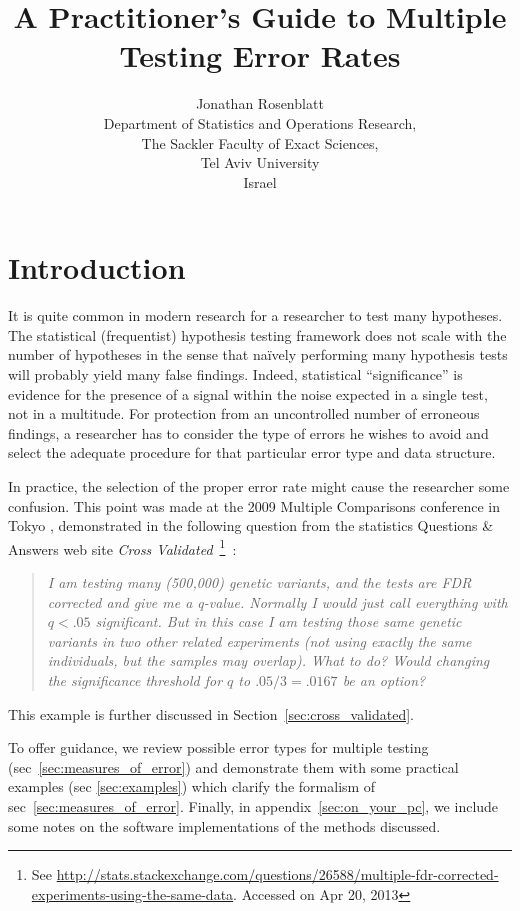 \documentclass[review,12pt]{article}
\title{A Practitioner's Guide to Multiple Testing Error Rates}
\author{Jonathan Rosenblatt \\
	Department of Statistics and Operations Research,\\
	The Sackler Faculty of Exact Sciences, \\
	Tel Aviv University \\ 
	Israel}
\date{}
\begin{document}
\maketitle


\section{Introduction}

It is quite common in modern research for a researcher to test many hypotheses. 
The statistical (frequentist) hypothesis testing framework does not scale with the number of hypotheses in the sense that na\"{i}vely performing many hypothesis tests will probably yield many false findings. 
Indeed, statistical ``significance'' is evidence for the presence of a signal within the noise expected in a single test, not in a multitude. 
For protection from an uncontrolled number of erroneous findings, a researcher has to consider the type of errors he wishes to avoid and select the adequate procedure for that particular error type and data structure. 

In practice, the selection of the proper error rate might cause the researcher some confusion. This point was made at the 2009 Multiple Comparisons conference in Tokyo \citep[][Section 4.4]{benjamini_simultaneous_2010}, demonstrated in the following question from the statistics Questions \& Answers web site \emph{Cross Validated}~\footnote{ See \url{http://stats.stackexchange.com/questions/26588/multiple-fdr-corrected-experiments-using-the-same-data}. Accessed on Apr 20, 2013}~:
\begin{quotation}\em
I am testing many (500,000) genetic variants, and the tests are FDR corrected and give me a q-value. Normally I would just call everything with $q < .05$ significant. But in this case I am testing those same genetic variants in two other related experiments (not using exactly the same individuals, but the samples may overlap). What to do? Would changing the significance threshold for $q$ to $.05/3=.0167$ be an option?
\end{quotation}
This example is  further discussed in Section~\ref{sec:cross_validated}. 

To offer guidance, we review possible error types for multiple testing (sec~\ref{sec:measures_of_error}) and demonstrate them with some practical examples (sec \ref{sec:examples}) which clarify the formalism of sec~\ref{sec:measures_of_error}. Finally, in appendix~\ref{sec:on_your_pc}, we include some notes on the software implementations of the methods discussed.
\end{document}
